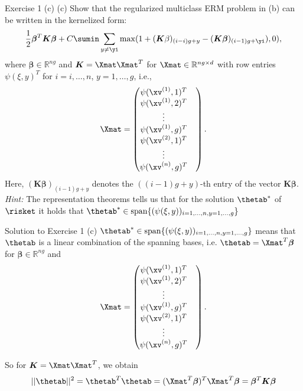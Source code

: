 \documentclass[aspectratio=169]{beamer}
\newcommand{\betav}{\bm{\beta}}
\newcommand{\Kmat}{\bm{K}}
\newcommand{\betab}{\bm{\beta}}
\begin{document}
\begin{frame}{Exercise 1 (c)}
	\footnotesize
	(c) Show that the regularized multiclass ERM problem in (b) can be written in the kernelized form:
	$$\frac{1}{2} \betav^T \Kmat \betav + C\sumin \sum_{y \neq \yi} \max (1 + (\Kmat \beta)_{(i-i)g + y} - (\Kmat \betav)_{(i-1)g + \yi}), 0),$$
	where $\betav \in \mathbb{R}^{ng}$ and $\Kmat = \Xmat \Xmat^T$ for $\Xmat \in \mathbb{R}^{ng \times d} $ with row entries $\psi(\xi, y)^T $ for $i = i, \ldots, n$, $y = 1, \ldots, g$, i.e., 
	$$\Xmat = \begin{pmatrix}
		\psi(\xv^{(1)}, 1)^T & \\
		\psi(\xv^{(1)}, 2)^T & \\
		\vdots & \\
		\psi(\xv^{(1)}, g)^T &  \\
		\psi(\xv^{(2)}, 1)^T & \\
		\vdots & \\
		\psi(\xv^{(n)}, g)^T &  \\
	\end{pmatrix}.$$
	Here, $(\Kmat \betav)_{(i-1)g + y}$ denotes the $((i-1)g + y)$-th entry of the vector $\Kmat \betav$. \emph{Hint:} The representation theorems tells us that for the solution $\thetab^*$ of $\risket$ it holds that $\thetab^* \in \mathrm{span} \{(\psi(\xi, y))_{i=1, \ldots, n, y=1, \ldots, g} \}$
\end{frame}

\begin{frame}{Solution to Exercise 1 (c)}
	$\thetab^* \in \mathrm{span} \{(\psi(\xi, y))_{i=1, \ldots, n, y=1, \ldots, g} \}$ means that $\thetab$ is a linear combination of the spanning bases, i.e. $\thetab = \Xmat^T \betab$ for $\betab \in \mathbb{R}^{ng}$ and 
	$$\Xmat = \begin{pmatrix}
		\psi(\xv^{(1)}, 1)^T & \\
		\psi(\xv^{(1)}, 2)^T & \\
		\vdots & \\
		\psi(\xv^{(1)}, g)^T &  \\
		\psi(\xv^{(2)}, 1)^T & \\
		\vdots & \\
		\psi(\xv^{(n)}, g)^T &  \\
	\end{pmatrix}.
	$$
	
	So for $\Kmat = \Xmat \Xmat^T$, we obtain
	$$||\thetab||^2 = \thetab^T \thetab = (\Xmat^T \betab)^T \Xmat^T \betab = \betab^T \Kmat \betab$$
\end{frame}
\end{document}
